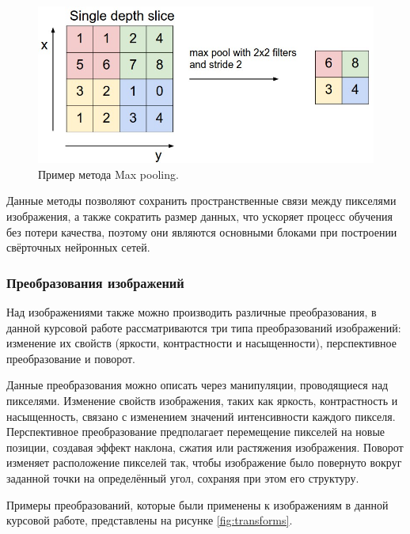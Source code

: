 \documentclass[14pt, russian]{scrartcl}
\begin{document}
\begin{figure}[H]
	\centering
	\begin{minipage}[t]{.5\textwidth}
		\centering
		\includegraphics[width=\linewidth]{./img/maxpooling.jpeg}
	\end{minipage}
	\caption{Пример метода Max pooling.}
	\label{fig:maxpooling}
\end{figure}

Данные методы позволяют сохранить пространственные связи между пикселями изображения, а также сократить размер данных, что ускоряет процесс обучения без потери качества, поэтому они являются основными блоками при построении свёрточных нейронных сетей.

\subsubsection{Преобразования изображений}
Над изображениями также можно производить различные преобразования, в данной курсовой работе рассматриваются три типа преобразований изображений: изменение их свойств (яркости, контрастности и насыщенности), перспективное преобразование и поворот.

Данные преобразования можно описать через манипуляции, проводящиеся над пикселями. Изменение свойств изображения, таких как яркость, контрастность и насыщенность, связано с изменением значений интенсивности каждого пикселя. Перспективное преобразование предполагает перемещение пикселей на новые позиции, создавая эффект наклона, сжатия или растяжения изображения. Поворот изменяет расположение пикселей так, чтобы изображение было повернуто вокруг заданной точки на определённый угол, сохраняя при этом его структуру.

Примеры преобразований, которые были применены к изображениям в данной курсовой работе, представлены на рисунке \ref{fig:transforms}.
\end{document}
